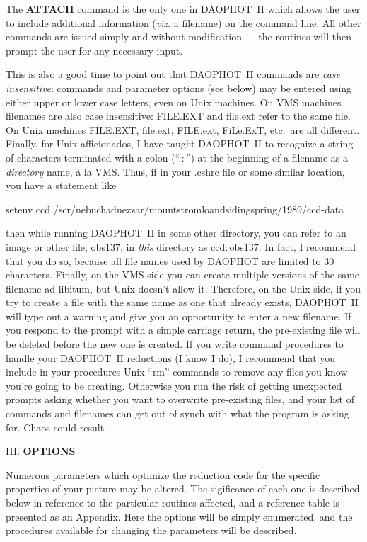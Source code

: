 The {\bf ATTACH} command is the only one in DAOPHOT~II which allows the
user to include additional information ({\it viz}. a filename) on the
command line. All other commands are issued simply and without
modification --- the routines will then prompt the user for any
necessary input.

This is also a good time to point out that DAOPHOT~II commands are {\it
case insensitive\/}:  commands and parameter options (see below) may be
entered using either upper or lower case letters, even on Unix
machines.  On VMS machines filenames are also case insensitive:
FILE.EXT and file.ext refer to the same file.  On Unix machines
FILE.EXT, file.ext, FILE.ext, FiLe.ExT, etc.\ are all different.
Finally, for Unix afficionados, I have taught DAOPHOT~II to recognize a
string of characters terminated with a colon (``$\,$:$\,$'') at the
beginning of a filename as a {\it directory\/} name, \`a la VMS.  Thus,
if in your .cshrc file or some similar location, you have a statement
like

\medskip
\noindent setenv ccd 
/scr/nebuchadnezzar/mountstromloandsidingspring/1989/ccd-data
\medskip

\noindent then while running DAOPHOT~II in some other directory, you
can refer to an image or other file, obs137, in {\it this\/} directory
as ccd:$\,$obs137.  In fact, I recommend that you do so, because all
file names used by DAOPHOT are limited to 30 characters.  Finally, on
the VMS side you can create multiple versions of the same filename ad
libitum, but Unix doesn't allow it.  Therefore, on the Unix side, if
you try to create a file with the same name as one that already exists,
DAOPHOT~II will type out a warning and give you an opportunity to enter
a new filename.  If you respond to the prompt with a simple carriage
return, the pre-existing file will be deleted before the new one is
created.  If you write command procedures to handle your DAOPHOT~II
reductions (I know I do), I recommend that you include in your
procedures Unix ``rm'' commands to remove any files you know you're
going to be creating.  Otherwise you run the risk of getting unexpected
prompts asking whether you want to overwrite pre-existing files, and
your list of commands and filenames can get out of synch with what the
program is asking for.  Chaos could result.

\vfill
\eject
\noindent III.  {\bf OPTIONS}

Numerous parameters which optimize the reduction code for the specific
properties of your picture may be altered.  The sigificance of each one
is described below in reference to the particular routines affected, and
a reference table is presented as an Appendix.  Here the options will
be simply enumerated, and the procedures available for changing the
parameters will be described.

